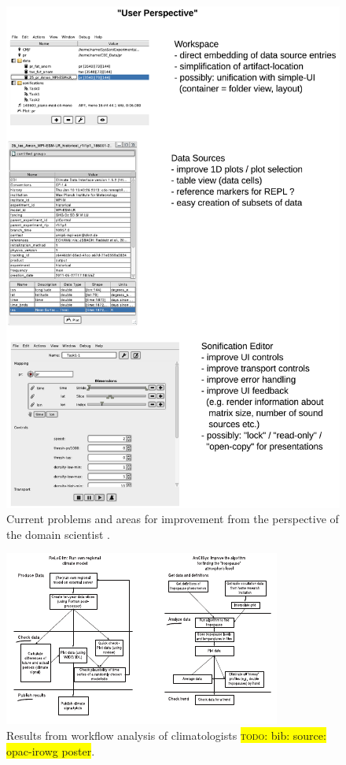 \documentclass[11pt,a4paper]{article}
\newcommand{\todo}[1]{\colorbox{yellow}{\textsc{todo}: #1}}
\begin{document}
\begin{figure}%
\includegraphics[width=\textwidth]{figures/status_ui_user.pdf}%
\caption{Current problems and areas for improvement from the perspective of the domain scientist \autocite{rutz2015sysson}.}%
\label{fig:status-ui-user}%
\end{figure}

\begin{figure}%
\includegraphics[width=\textwidth]{figures/egu_poster_workflow4.pdf}%
\caption{Results from workflow analysis of climatologists %
\todo{bib: source: opac-irowg poster}.}%
\label{fig:wegc-workflows}%
\end{figure}
\end{document}
